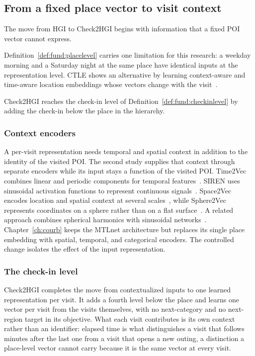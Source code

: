 \subsection{From a fixed place vector to visit context}

The move from HGI to Check2HGI begins with information that a fixed POI vector cannot
express.

Definition~\ref{def:fund:placelevel} carries one limitation for this research: a
weekday morning and a Saturday night at the same place have identical inputs at the
representation level. CTLE shows an alternative by learning context-aware and
time-aware location embeddings whose vectors change with the
visit~\cite{lin2021ctle}.

Check2HGI reaches the check-in level of Definition~\ref{def:fund:checkinlevel} by
adding the check-in below the place in the hierarchy.

\subsubsection{Context encoders}

A per-visit representation needs temporal and spatial context in addition to the
identity of the visited POI. The second study supplies that context through separate
encoders while its input stays a function of the visited POI.
Time2Vec combines linear and periodic components for temporal
features~\cite{kazemi2019time2vec}. SIREN uses sinusoidal activation functions to
represent continuous signals~\cite{sitzmann2020implicit}. Space2Vec encodes location
and spatial context at several scales~\cite{mai2020multiscalerepresentationlearningspatial},
while Sphere2Vec represents coordinates on a sphere rather than on a flat
surface~\cite{mai2023sphere2vecgeneralpurposelocationrepresentation}. A related
approach combines spherical harmonics with sinusoidal
networks~\cite{russwurm2024geographiclocationencodingspherical}.
Chapter~\ref{ch:courb} keeps the MTLnet architecture but replaces its single
place embedding with spatial, temporal, and categorical encoders. The controlled
change isolates the effect of the input representation.

\subsubsection{The check-in level}


Check2HGI completes the move from contextualized inputs to one learned representation
per visit. It adds a fourth level below the place and learns one vector per visit from
the visits themselves, with no next-category and no next-region target in its
objective. What each visit contributes is its own context rather than an identifier: elapsed time
is what distinguishes a visit that follows minutes after the last one from a visit that opens a new
outing, a distinction a place-level vector cannot carry because it is the same vector at every
visit.

